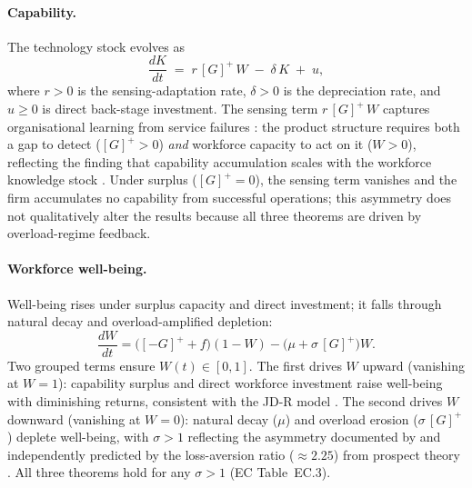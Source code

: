 \documentclass[msom,dblanonrev]{informs4}
\newcommand{\Gp}{[G]^{+}}
\newcommand{\Gm}{[-G]^{+}}
\begin{document}
\paragraph{Capability.}
The technology stock evolves as
\begin{equation}\label{eq:dK}
    \frac{dK}{dt} \;=\; r\,\Gp\, W \;-\; \delta\, K \;+\; u,
\end{equation}
where $r > 0$ is the sensing-adaptation rate, $\delta > 0$ is the depreciation rate, and $u \geq 0$ is direct back-stage investment. The sensing term $r\,\Gp\, W$ captures organisational learning from service failures \citep{tucker2007operational}: the product structure requires both a gap to detect ($\Gp > 0$) \emph{and} workforce capacity to act on it ($W > 0$), reflecting the finding that capability accumulation scales with the workforce knowledge stock \citep{argote1990learning}. Under surplus ($\Gp = 0$), the sensing term vanishes and the firm accumulates no capability from successful operations; this asymmetry does not qualitatively alter the results because all three theorems are driven by overload-regime feedback.

\paragraph{Workforce well-being.}
Well-being rises under surplus capacity and direct investment; it falls through natural decay and overload-amplified depletion:
\begin{equation}\label{eq:dW}
    \frac{dW}{dt} = \bigl(\Gm + f\bigr)(1 - W) - \bigl(\mu + \sigma\,\Gp\bigr) W.
\end{equation}
Two grouped terms ensure $W(t) \in [0,1]$. The first drives $W$ upward (vanishing at $W = 1$): capability surplus and direct workforce investment raise well-being with diminishing returns, consistent with the JD-R model \citep{bakker2007job}. The second drives $W$ downward (vanishing at $W = 0$): natural decay ($\mu$) and overload erosion ($\sigma\,\Gp$) deplete well-being, with $\sigma > 1$ reflecting the asymmetry documented by \citet{oliva2001cutting} and independently predicted by the loss-aversion ratio (${\approx}2.25$) from prospect theory \citep{tversky1992advances}. All three theorems hold for any $\sigma > 1$ (EC Table~EC.3).
\end{document}
